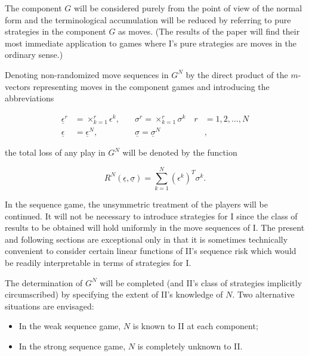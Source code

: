 \documentclass[11pt]{article}
\numberwithin{equation}{section}
\theoremstyle{boldStyle}
\begin{document}
The component \( G \) will be considered purely from the point of view of the normal form and the terminological accumulation 
will be reduced by referring to pure strategies in the component \( G \) as moves. 
(The results of the paper will find their most immediate application to games where I's pure 
strategies are moves in the ordinary sense.)

Denoting non-randomized move sequences in \( G^N \) by the direct product of the \( m \)-vectors 
representing moves in the component 
games and introducing the abbreviations

\begin{equation}
    \begin{aligned}
        \underline{\epsilon}^r  &= \times_{k=1}^r \epsilon^k, \quad &\sigma^r = \times_{k=1}^r \sigma^k \quad r &= 1, 2, \ldots, N \\
        \underline{\epsilon} &= \underline{\epsilon}^{N}, \quad &\underline{\sigma} = \underline{\sigma}^{N} &,
    \end{aligned}
\end{equation}

the total loss of any play in \( G^N \) will be denoted by the function

\begin{equation}
    R^N(\underline{\epsilon}, \underline{\sigma}) = \sum_{k=1}^{N} (\epsilon^k)^T \sigma^k.
\end{equation}

In the sequence game, the unsymmetric treatment of the players will be continued. It will not be 
necessary to introduce strategies for I since the class of results to be obtained will hold uniformly 
in the move sequences of I. The present and following sections are exceptional only in that it 
is sometimes technically convenient to consider certain linear functions of II's sequence risk which 
would be readily interpretable in terms of strategies for I.

The determination of \( G^N \) will be completed (and II's class of strategies implicitly circumscribed) 
by specifying the extent of II's knowledge of \( N \). Two alternative situations are envisaged:
\begin{itemize}
    \item In the weak sequence game, \( N \) is known to II at each component;
    \item In the strong sequence game, \( N \) is completely unknown to II.
\end{itemize}
\end{document}
